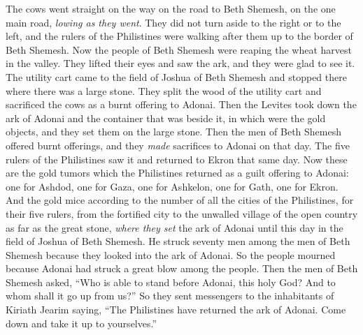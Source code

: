\begin{biblechapter}
\verse The cows went straight on the way on the road to Beth Shemesh, on the one main road, \textit{lowing as they went}. They did not turn aside to the right or to the left, and the rulers of the Philistines were walking after them up to the border of Beth Shemesh.
\verse Now the people of Beth Shemesh were reaping the wheat harvest in the valley. They lifted their eyes and saw the ark, and they were glad to see it.
\verse The utility cart came to the field of Joshua of Beth Shemesh and stopped there where there was a large stone. They split the wood of the utility cart and sacrificed the cows as a burnt offering to Adonai.
\verse Then the Levites took down the ark of Adonai and the container that was beside it, in which were the gold objects, and they set them on the large stone. Then the men of Beth Shemesh offered burnt offerings, and they \textit{made} sacrifices to Adonai on that day.
\verse The five rulers of the Philistines saw it and returned to Ekron that same day.
\verse Now these are the gold tumors which the Philistines returned as a guilt offering to Adonai: one for Ashdod, one for Gaza, one for Ashkelon, one for Gath, one for Ekron.
\verse And the gold mice according to the number of all the cities of the Philistines, for their five rulers, from the fortified city to the unwalled village of the open country as far as the great stone, \textit{where they set} the ark of Adonai until this day in the field of Joshua of Beth Shemesh.
\verse He struck seventy men among the men of Beth Shemesh because they looked into the ark of Adonai. So the people mourned because Adonai had struck a great blow among the people.
\verse Then the men of Beth Shemesh asked, “Who is able to stand before Adonai, this holy God? And to whom shall it go up from us?”
\verse So they sent messengers to the inhabitants of Kiriath Jearim saying, “The Philistines have returned the ark of Adonai. Come down and take it up to yourselves.”
\end{biblechapter}

